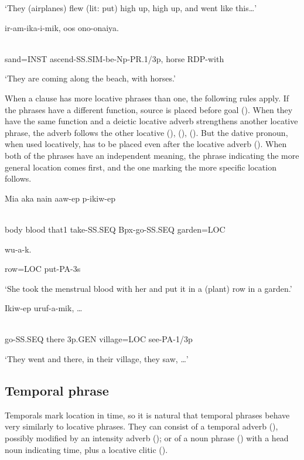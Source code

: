 `They (airplanes) flew (lit: put) high up, high up, and went like this{\dots}'

\ea%
\label{ex:x867}
\gll {}  ir-am-ika-i-mik,  oos  ono-onaiya. \\
      \\
\glt
\z

sand=INST  ascend-SS.SIM-be-Np-PR.1/3p,  horse  RDP-with

`They are coming along the beach, with horses.'

When a clause has more locative phrases than one, the following rules apply. If  the phrases have a different function, source is placed before goal (). When they have the same function and a deictic locative adverb strengthens another locative phrase, the adverb follows the other locative (), (), (). But  the dative pronoun, when used locatively, has to be placed even after the locative adverb (). When both of the phrases have an independent meaning, the phrase indicating the more general location comes first, and the one marking the more specific location follows.

\ea%
\label{ex:x868}
\gll Mia  aka  nain  aaw-ep  p-ikiw-ep   \\
      \\
\glt
\z

body  blood  that1  take-SS.SEQ  Bpx-go-SS.SEQ  garden=LOC  

  wu-a-k.

row=LOC  put-PA-3s

`She took the menstrual blood with her and put it in a (plant) row in a garden.'

\ea%
\label{ex:x869}
\gll Ikiw-ep    uruf-a-mik,  {\dots }\\
      \\
\glt
\z

go-SS.SEQ  there  3p.GEN  village=LOC  see-PA-1/3p

`They went and there, in their village, they saw, {\dots}'

\subsection{Temporal phrase}
\hypertarget{RefHeading21861935131865}{}
Temporals mark location in time, so it is natural that temporal phrases behave very similarly to locative phrases.  They can consist of a temporal adverb (), possibly modified by an intensity adverb (); or of a noun phrase () with a head noun indicating time, plus a locative clitic ().

